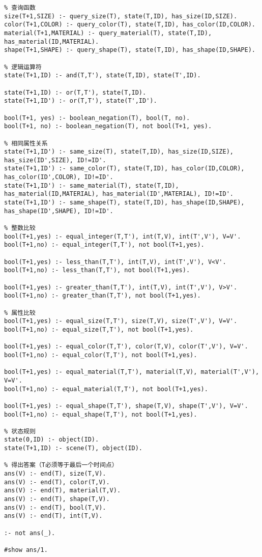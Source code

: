 \begin{lstlisting}
% 查询函数
size(T+1,SIZE) :- query_size(T), state(T,ID), has_size(ID,SIZE).
color(T+1,COLOR) :- query_color(T), state(T,ID), has_color(ID,COLOR).
material(T+1,MATERIAL) :- query_material(T), state(T,ID), has_material(ID,MATERIAL).
shape(T+1,SHAPE) :- query_shape(T), state(T,ID), has_shape(ID,SHAPE).

% 逻辑运算符
state(T+1,ID) :- and(T,T'), state(T,ID), state(T',ID).

state(T+1,ID) :- or(T,T'), state(T,ID).
state(T+1,ID') :- or(T,T'), state(T',ID').

bool(T+1, yes) :- boolean_negation(T), bool(T, no).
bool(T+1, no) :- boolean_negation(T), not bool(T+1, yes).

% 相同属性关系
state(T+1,ID') :- same_size(T), state(T,ID), has_size(ID,SIZE), has_size(ID',SIZE), ID!=ID'.
state(T+1,ID') :- same_color(T), state(T,ID), has_color(ID,COLOR), has_color(ID',COLOR), ID!=ID'.
state(T+1,ID') :- same_material(T), state(T,ID), has_material(ID,MATERIAL), has_material(ID',MATERIAL), ID!=ID'.
state(T+1,ID') :- same_shape(T), state(T,ID), has_shape(ID,SHAPE), has_shape(ID',SHAPE), ID!=ID'.

% 整数比较
bool(T+1,yes) :- equal_integer(T,T'), int(T,V), int(T',V'), V=V'.
bool(T+1,no) :- equal_integer(T,T'), not bool(T+1,yes).

bool(T+1,yes) :- less_than(T,T'), int(T,V), int(T',V'), V<V'.
bool(T+1,no) :- less_than(T,T'), not bool(T+1,yes).

bool(T+1,yes) :- greater_than(T,T'), int(T,V), int(T',V'), V>V'.
bool(T+1,no) :- greater_than(T,T'), not bool(T+1,yes).

% 属性比较
bool(T+1,yes) :- equal_size(T,T'), size(T,V), size(T',V'), V=V'.
bool(T+1,no) :- equal_size(T,T'), not bool(T+1,yes).

bool(T+1,yes) :- equal_color(T,T'), color(T,V), color(T',V'), V=V'.
bool(T+1,no) :- equal_color(T,T'), not bool(T+1,yes).

bool(T+1,yes) :- equal_material(T,T'), material(T,V), material(T',V'), V=V'.
bool(T+1,no) :- equal_material(T,T'), not bool(T+1,yes).

bool(T+1,yes) :- equal_shape(T,T'), shape(T,V), shape(T',V'), V=V'.
bool(T+1,no) :- equal_shape(T,T'), not bool(T+1,yes).

% 状态规则
state(0,ID) :- object(ID).
state(T+1,ID) :- scene(T), object(ID).

% 得出答案（T必须等于最后一个时间点）
ans(V) :- end(T), size(T,V).
ans(V) :- end(T), color(T,V).
ans(V) :- end(T), material(T,V).
ans(V) :- end(T), shape(T,V).
ans(V) :- end(T), bool(T,V).
ans(V) :- end(T), int(T,V).

:- not ans(_).

#show ans/1.
\end{lstlisting}
